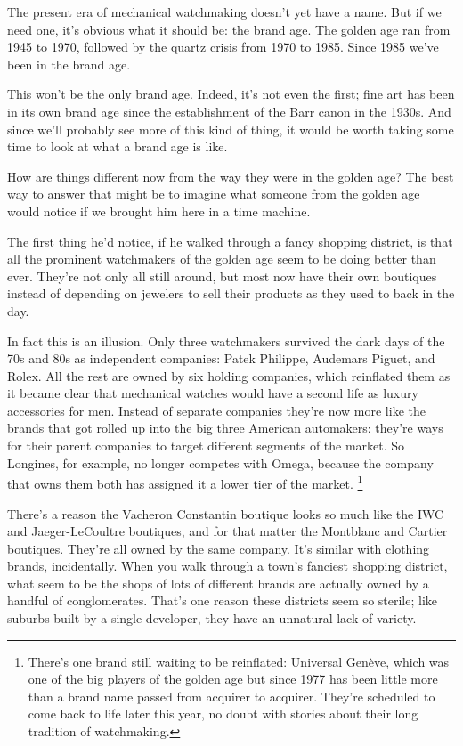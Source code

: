 \documentclass[12pt]{book}
\begin{document}
The present era of mechanical watchmaking doesn't yet have a name. But
if we need one, it's obvious what it should be: the brand age. The
golden age ran from 1945 to 1970, followed by the quartz crisis from
1970 to 1985. Since 1985 we've been in the brand age.

This won't be the only brand age. Indeed, it's not even the first; fine
art has been in its own brand age since the establishment of the Barr
canon in the 1930s. And since we'll probably see more of this kind of
thing, it would be worth taking some time to look at what a brand age is
like.

How are things different now from the way they were in the golden age?
The best way to answer that might be to imagine what someone from the
golden age would notice if we brought him here in a time machine.

The first thing he'd notice, if he walked through a fancy shopping
district, is that all the prominent watchmakers of the golden age seem
to be doing better than ever. They're not only all still around, but
most now have their own boutiques instead of depending on jewelers to
sell their products as they used to back in the day.

In fact this is an illusion. Only three watchmakers survived the dark
days of the 70s and 80s as independent companies: Patek Philippe,
Audemars Piguet, and Rolex. All the rest are owned by six holding
companies, which reinflated them as it became clear that mechanical
watches would have a second life as luxury accessories for men. Instead
of separate companies they're now more like the brands that got rolled
up into the big three American automakers: they're ways for their parent
companies to target different segments of the market. So Longines, for
example, no longer competes with Omega, because the company that owns
them both has assigned it a lower tier of the market.
\footnote{There's one brand still waiting to be reinflated: Universal
Genève, which was one of the big players of the golden age but since
1977 has been little more than a brand name passed from acquirer to
acquirer. They're scheduled to come back to life later this year, no
doubt with stories about their long tradition of watchmaking.}

There's a reason the Vacheron Constantin boutique looks so much like the
IWC and Jaeger-LeCoultre boutiques, and for that matter the Montblanc
and Cartier boutiques. They're all owned by the same company. It's
similar with clothing brands, incidentally. When you walk through a
town's fanciest shopping district, what seem to be the shops of lots of
different brands are actually owned by a handful of conglomerates.
That's one reason these districts seem so sterile; like suburbs built by
a single developer, they have an unnatural lack of variety.
\end{document}
